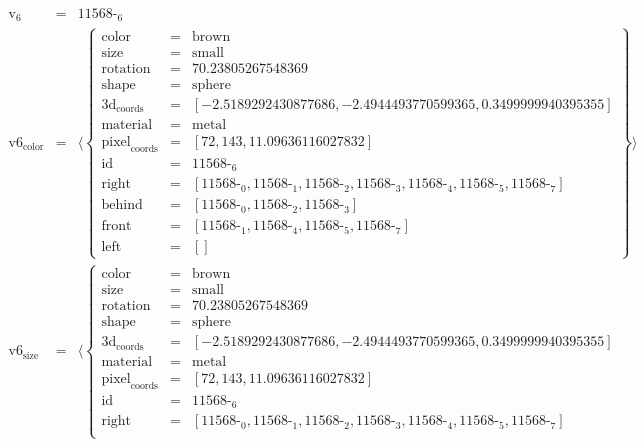 \documentclass{minimal}
\begin{document}
$$\begin{array}{rcl}
\text{v}_{\text{6}} &=& \text{11568-}_{\text{6}}\\
\text{v6}_{\text{color}} &=& \langle \left\{\begin{array}{rcl}
\text{color} &=& \text{brown}\\
\text{size} &=& \text{small}\\
\text{rotation} &=& 70.23805267548369\\
\text{shape} &=& \text{sphere}\\
\text{3d}_{\text{coords}} &=& [ -2.5189292430877686, -2.4944493770599365, 0.3499999940395355]\\
\text{material} &=& \text{metal}\\
\text{pixel}_{\text{coords}} &=& [ 72, 143, 11.09636116027832]\\
\text{id} &=& \text{11568-}_{\text{6}}\\
\text{right} &=& [ \text{11568-}_{\text{0}}, \text{11568-}_{\text{1}}, \text{11568-}_{\text{2}}, \text{11568-}_{\text{3}}, \text{11568-}_{\text{4}}, \text{11568-}_{\text{5}}, \text{11568-}_{\text{7}}]\\
\text{behind} &=& [ \text{11568-}_{\text{0}}, \text{11568-}_{\text{2}}, \text{11568-}_{\text{3}}]\\
\text{front} &=& [ \text{11568-}_{\text{1}}, \text{11568-}_{\text{4}}, \text{11568-}_{\text{5}}, \text{11568-}_{\text{7}}]\\
\text{left} &=& [ ]
\end{array}\right\}\rangle\\
\text{v6}_{\text{size}} &=& \langle \left\{\begin{array}{rcl}
\text{color} &=& \text{brown}\\
\text{size} &=& \text{small}\\
\text{rotation} &=& 70.23805267548369\\
\text{shape} &=& \text{sphere}\\
\text{3d}_{\text{coords}} &=& [ -2.5189292430877686, -2.4944493770599365, 0.3499999940395355]\\
\text{material} &=& \text{metal}\\
\text{pixel}_{\text{coords}} &=& [ 72, 143, 11.09636116027832]\\
\text{id} &=& \text{11568-}_{\text{6}}\\
\text{right} &=& [ \text{11568-}_{\text{0}}, \text{11568-}_{\text{1}}, \text{11568-}_{\text{2}}, \text{11568-}_{\text{3}}, \text{11568-}_{\text{4}}, \text{11568-}_{\text{5}}, \text{11568-}_{\text{7}}]\\

\end{array}
\end{array}$$
\end{document}
